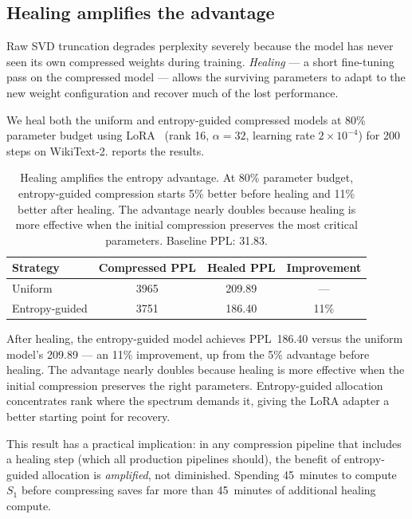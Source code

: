 \documentclass[11pt,a4paper]{article}
\newcommand{\Svn}{S_1}
\begin{document}
\subsection{Healing amplifies the advantage}
\label{sec:comp-healing}

Raw SVD truncation degrades perplexity severely because the model
has never seen its own compressed weights during training.
\emph{Healing} --- a short fine-tuning pass on the compressed model
--- allows the surviving parameters to adapt to the new weight
configuration and recover much of the lost performance.

We heal both the uniform and entropy-guided compressed models at
80\% parameter budget using LoRA~\citep{Hu2021} (rank 16,
$\alpha = 32$, learning rate $2 \times 10^{-4}$) for 200 steps on
WikiText-2.   reports the results.

\begin{table}[htbp]
\centering
\caption{Healing amplifies the entropy advantage.  At 80\% parameter
  budget, entropy-guided compression starts 5\% better before healing
  and 11\% better after healing.  The advantage nearly doubles because
  healing is more effective when the initial compression preserves the
  most critical parameters.  Baseline PPL: 31.83.}
\label{tab:healing}
\begin{tabular}{@{}lccc@{}}
\toprule
Strategy & Compressed PPL & Healed PPL & Improvement \\
\midrule
Uniform        & 3965  & 209.89 & --- \\
Entropy-guided & 3751  & 186.40 & 11\% \\
\bottomrule
\end{tabular}
\end{table}

After healing, the entropy-guided model achieves PPL~186.40 versus
the uniform model's 209.89 --- an 11\% improvement, up from the
5\% advantage before healing.  The advantage nearly doubles because
healing is more effective when the initial compression preserves the
right parameters.  Entropy-guided allocation concentrates rank where
the spectrum demands it, giving the LoRA adapter a better starting
point for recovery.

This result has a practical implication: in any compression pipeline
that includes a healing step (which all production pipelines should),
the benefit of entropy-guided allocation is \emph{amplified}, not
diminished.  Spending 45~minutes to compute $\Svn$ before
compressing saves far more than 45~minutes of additional healing
compute.
\end{document}
